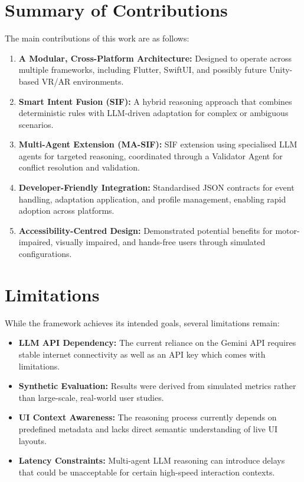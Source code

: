 \documentclass[openany]{book}
\begin{document}
\section{Summary of Contributions}
The main contributions of this work are as follows:
\begin{enumerate}
    \item \textbf{A Modular, Cross-Platform Architecture:} Designed to operate across multiple frameworks, including Flutter, SwiftUI, and possibly future Unity-based VR/AR environments.
    \item \textbf{Smart Intent Fusion (SIF):} A hybrid reasoning approach that combines deterministic rules with LLM-driven adaptation for complex or ambiguous scenarios.
    \item \textbf{Multi-Agent Extension (MA-SIF):} SIF extension using specialised LLM agents for targeted reasoning, coordinated through a Validator Agent for conflict resolution and validation.
    \item \textbf{Developer-Friendly Integration:} Standardised JSON contracts for event handling, adaptation application, and profile management, enabling rapid adoption across platforms.
    \item \textbf{Accessibility-Centred Design:} Demonstrated potential benefits for motor-impaired, visually impaired, and hands-free users through simulated configurations.
\end{enumerate}

\section{Limitations}
While the framework achieves its intended goals, several limitations remain:
\begin{itemize}
    \item \textbf{LLM API Dependency:} The current reliance on the Gemini API requires stable internet connectivity as well as an API key which comes with limitations.
    \item \textbf{Synthetic Evaluation:} Results were derived from simulated metrics rather than large-scale, real-world user studies.
    \item \textbf{UI Context Awareness:} The reasoning process currently depends on predefined metadata and lacks direct semantic understanding of live UI layouts.
    \item \textbf{Latency Constraints:} Multi-agent LLM reasoning can introduce delays that could be unacceptable for certain high-speed interaction contexts.
\end{itemize}
\end{document}
